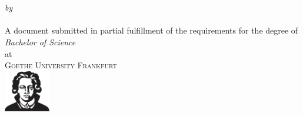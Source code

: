 \begin{titlepage}
  \vspace*{5cm}
  \makeatletter
  \begin{center}
    \begin{Huge}
      \@title
    \end{Huge}\\[0.1cm]
    \begin{Large}
      \@subtitle
    \end{Large}\\
    \emph{by}\\
    \@author\\[\baselineskip]
    \@date
    \vfill
    A document submitted in partial fulfillment
    of the requirements for the degree of\\
    \emph{Bachelor of Science}\\
    at\\
    \textsc{Goethe University Frankfurt}\\[2\baselineskip]
    \includegraphics[width=2cm]{Sources/Goethe_kompakt}
  \end{center}
  \makeatother
\end{titlepage}

\newpage
\null
\thispagestyle{empty}
\newpage
